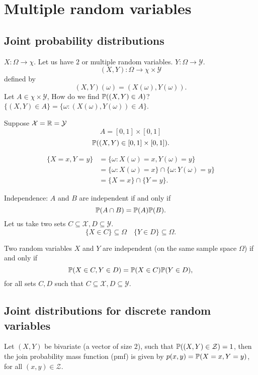 \documentclass[10pt, a4paper]{article}
\begin{document}
\newpage

\section{Multiple random variables}

\subsection{Joint probability distributions}
$X : \Omega \rightarrow \chi$.
Let us have $2$ or multiple random variables.
$Y : \Omega \rightarrow \mathcal{Y}$.
\[
(X, Y) : \Omega \rightarrow \chi \times \mathcal{Y}
\]
defined by
\[
(X, Y)(\omega) = (X(\omega), Y(\omega)).
\]
Let $A \in \chi \times \mathcal{Y}$,
How do we find $\P((X, Y) \in A)$?
$\{(X, Y) \in A\} = \{\omega : (X(\omega), Y(\omega)) \in A\}$.
\begin{example}
    Suppose $\mathcal{X} = \R = \mathcal{Y}$
    \[
    A = [0, 1] \times [0, 1]
    \]
    \[
    \P((X, Y) \in [0, 1] \times [0, 1]).
    \]
\end{example}
\begin{align*}
    \{X = x, Y = y\} &= \{\omega : X(\omega) = x, Y(\omega) = y\} \\
    &= \{\omega : X(\omega) = x\} \cap \{\omega : Y(\omega) = y\} \\
    &= \{X = x\} \cap \{Y = y\}.
\end{align*}

Independence:
$A$ and $B$ are independent if and only if
\[
\P(A \cap B) = \P(A)\P(B).
\]
Let us take two sets $C \subseteq \mathcal{X}, D \subseteq \mathcal{Y}$.
\[
\{X \in C\} \subseteq \Omega\quad \{Y \in D\} \subseteq \Omega.
\]
\begin{definition}
    Two random variables $X$ and $Y$ are independent
    (on the same sample space $\Omega$)
    if and only if
    \[
    \P(X \in C, Y \in D) = \P(X \in C)\P(Y \in D),
    \]
    for all sets $C, D$ such that $C \subseteq \mathcal{X}, D \subseteq \mathcal{Y}$.
\end{definition}

\subsection{Joint distributions for discrete random variables}
\begin{definition}
    Let $(X, Y)$ be bivariate
    (a vector of size $2$),
    such that $\P((X, Y) \in \mathcal{Z}) = 1$,
    then the join probability mass function
    (pmf)
    is given by $p(x, y) = \P(X = x, Y = y)$, for all $(x, y) \in \mathcal{Z}$.
\end{definition}
\end{document}
